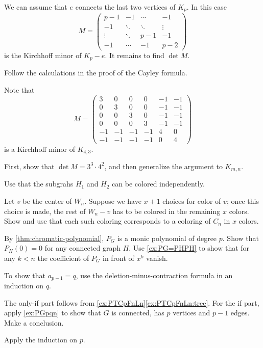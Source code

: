 We can assume that $e$ connects the last two vertices of $K_p$.
In this case
\[
M=\left(
\begin{matrix}
p{-}1&-1&\cdots&-1
\\
-1&\ddots&\ddots&\vdots
\\
\vdots&\ddots&p{-}1&-1
\\
-1&\cdots&-1&p{-}2
\end{matrix}
\right)
\]
is the Kirchhoff minor of $K_p-e$.
It remains to find $\det M$.

Follow the calculations in the proof of the Cayley formula.

Note that
\[
M=
\left(
\begin{matrix}
3&0&0&0&-1&-1
\\
0&3&0&0&-1&-1
\\
0&0&3&0&-1&-1
\\
0&0&0&3&-1&-1
\\
-1&-1&-1&-1&4&0
\\
-1&-1&-1&-1&0&4
\end{matrix}
\right)\]
is a Kirchhoff minor of $K_{4,3}$.

First, show that $\det M=3^3\cdot 4^2$,
and then generalize the argument to $K_{m,n}$.

\setcounter{eqtn}{0}

Use that the subgrahs $H_1$ and $H_2$ can be colored independently.

 Let $v$ be the center of $W_n$.
Suppose we have $x+1$ choices for color of $v$;
once this choice is made, the rest of $W_n-v$ has to be colored in the remaining $x$ colors.
Show and use that each such coloring corresponds to a coloring of $C_n$ in $x$ colors. 

By \ref{thm:chromatic-polynomial}, $P_G$ is a monic polynomial of degree $p$.
Show that $P_H(0)=0$ for any connected graph $H$.
Use \ref{ex:PG=PHPH} to show that for any $k<n$ the coefficient of $P_G$ in front of $x^k$ vanish.

To show that $a_{p-1}=q$,
use the deletion-minus-contraction formula in an induction on $q$.

 The only-if part follows from \ref{ex:PTCpFnLn}\ref{ex:PTCpFnLn:tree}.
For the if part, apply \ref{ex:PGpqn} to show that $G$ is connected, has $p$ vertices and $p-1$ edges.
Make a conclusion.

 Apply the induction on $p$.


